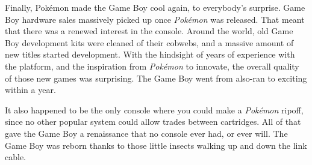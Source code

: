 \documentclass{book}
\begin{document}
Finally, Pokémon made the Game Boy cool again, to everybody’s surprise. Game Boy hardware sales massively picked up once \emph{Pokémon} was released. That meant that there was a renewed interest in the console. Around the world, old Game Boy development kits were cleaned of their cobwebs, and a massive amount of new titles started development. With the hindsight of years of experience with the platform, and the inspiration from \emph{Pokémon} to innovate, the overall quality of those new games was surprising. The Game Boy went from also-ran to exciting within a year.\par
It also happened to be the only console where you could make a \emph{Pokémon} ripoff, since no other popular system could allow trades between cartridges. All of that gave the Game Boy a renaissance that no console ever had, or ever will. The Game Boy was reborn thanks to those little insects walking up and down the link cable.\par
\end{document}
